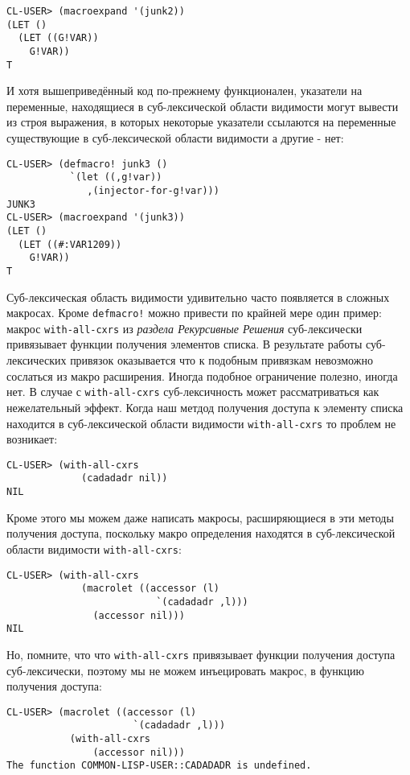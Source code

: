 \begin{verbatim}
CL-USER> (macroexpand '(junk2))
(LET ()
  (LET ((G!VAR))
    G!VAR))
T
\end{verbatim}

И хотя вышеприведённый код по-прежнему функционален, указатели на переменные, находящиеся в суб-лексической области видимости могут вывести из строя выражения, в которых некоторые указатели ссылаются на переменные существующие в суб-лексической области видимости а другие - нет:

\begin{verbatim}
CL-USER> (defmacro! junk3 ()
           `(let ((,g!var))
              ,(injector-for-g!var)))
JUNK3
CL-USER> (macroexpand '(junk3))
(LET ()
  (LET ((#:VAR1209))
    G!VAR))
T
\end{verbatim}

Суб-лексическая область видимости удивительно часто появляется в сложных макросах. Кроме \verb"defmacro!" можно привести по крайней мере один пример: макрос \verb"with-all-cxrs" из \emph{раздела Рекурсивные Решения} суб-лексически привязывает функции получения элементов списка. В результате работы суб-лексических привязок оказывается что к подобным привязкам невозможно сослаться из макро расширения. Иногда подобное ограничение полезно, иногда нет. В случае с \verb"with-all-cxrs" суб-лексичность может рассматриваться как нежелательный эффект. Когда наш метдод получения доступа к элементу списка находится в суб-лексической области видимости \verb"with-all-cxrs" то проблем не возникает:

\begin{verbatim}
CL-USER> (with-all-cxrs
             (cadadadr nil))
NIL
\end{verbatim}

Кроме этого мы можем даже написать макросы, расширяющиеся в эти методы получения доступа, поскольку макро определения находятся в суб-лексической области видимости \verb"with-all-cxrs":

\begin{verbatim}
CL-USER> (with-all-cxrs
             (macrolet ((accessor (l)
                          `(cadadadr ,l)))
               (accessor nil)))
NIL
\end{verbatim}

Но, помните, что что \verb"with-all-cxrs" привязывает функции получения доступа суб-лексически, поэтому мы не можем инъецировать макрос, в функцию получения доступа:

\begin{verbatim}
CL-USER> (macrolet ((accessor (l)
                      `(cadadadr ,l)))
           (with-all-cxrs
               (accessor nil)))
The function COMMON-LISP-USER::CADADADR is undefined.
\end{verbatim}

